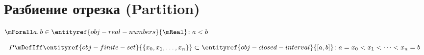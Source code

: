 
\section{Разбиение отрезка (Partition)}

\hypertarget{obj-partition}{}
\hypertarget{obj-partition}{}
\begin{object}
\label{entity:obj-partition}
$\mForall a, b \in \entityref{obj-real-numbers}{\mReal} \colon a < b$

\[
P \mDefIff
\entityref{obj-finite-set}{\{x_0, x_1, \ldots, x_n\}} \subset \entityref{obj-closed-interval}{[a, b]}
\colon a = x_0 < x_1 < \cdots < x_n = b
\]
\end{object}